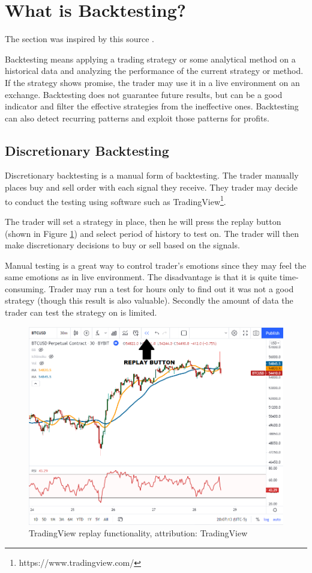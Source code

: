 \section{What is Backtesting?}
The section was inspired by this source \cite{backtesting-crypto-trading-strategies}.

Backtesting means applying a trading strategy or some analytical method on a historical data and analyzing the performance of the current strategy or method. If the strategy shows promise, the trader may use it in a live environment on an exchange. Backtesting does not guarantee future results, but can be a good indicator and filter the effective strategies from the ineffective ones. Backtesting can also detect recurring patterns and exploit those patterns for profits.

\subsection*{Discretionary Backtesting}
Discretionary backtesting is a manual form of backtesting. The trader manually places buy and sell order with each signal they receive. They trader may decide to conduct the testing using software such as TradingView\footnote{https://www.tradingview.com/}.

The trader will set a strategy in place, then he will press the replay button (shown in Figure \ref{tradingview-figure}) and select period of history to test on. The trader will then make discretionary decisions to buy or sell based on the signals.

Manual testing is a great way to control trader's emotions since they may feel the same emotions as in live environment. The disadvantage is that it is quite time-consuming. Trader may run a test for hours only to find out it was not a good strategy (though this result is also valuable). Secondly the amount of data the trader can test the strategy on is limited.

\begin{figure}[ht]
    \centering
    \includegraphics[width=\columnwidth]{figures/tradingview-replay.png}
    \caption{TradingView replay functionality, attribution: TradingView \cite{backtesting-crypto-trading-strategies}}
    \label{tradingview-figure}
\end{figure}

